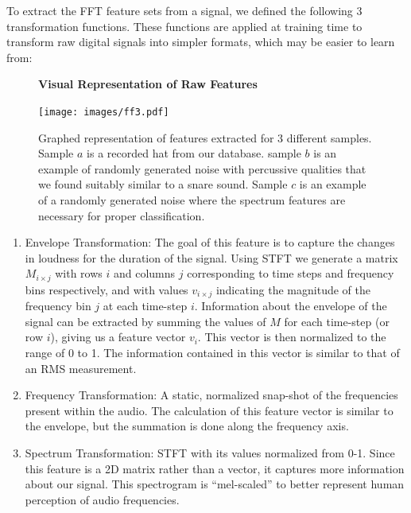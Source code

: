 \documentclass[\main/thesis.tex]{subfiles}
\begin{document}
To extract the FFT feature sets from a signal, we defined the following 3 transformation functions. These functions are applied at training time to transform raw digital signals into simpler formats, which may be easier to learn from: 
\begin{figure}
\centering
\textbf{Visual Representation of Raw Features}\par\medskip
    { \texttt{[image: images/ff3.pdf]}}
\caption{Graphed representation of features extracted for 3 different samples. Sample $a$ is a recorded hat from our database. sample $b$ is an example of randomly generated noise with percussive qualities that we found suitably similar to a snare sound. Sample $c$ is an example of a randomly generated noise where the spectrum features are necessary for proper classification.}
\label{fig:stackspectrums}
\end{figure}
\begin{enumerate}
\item Envelope Transformation: The goal of this feature is to capture the changes in loudness for the duration of the signal. Using STFT we generate a matrix $M_{i \times j}$ with rows $i$ and columns $j$ corresponding to time steps and frequency bins respectively, and with values $v_{i \times j}$ indicating the magnitude of the frequency bin $j$ at each time-step $i$. Information about the envelope of the signal can be extracted by summing the values of $M$ for each time-step (or row $i$), giving us a feature vector $v_i$. This vector is then normalized to the range of 0 to 1. The information contained in this vector is similar to that of an RMS measurement.
\item Frequency Transformation: A static, normalized snap-shot of the  frequencies present within the audio. The calculation of this feature vector is similar to the envelope, but the summation is done along the frequency axis.
\item Spectrum Transformation: STFT with its values normalized from 0-1. Since this feature is a 2D matrix rather than a vector, it captures more information about our signal. This spectrogram is \enquote{mel-scaled}\cite{stevens1940relation} to better represent human perception of audio frequencies.
\end{enumerate}
\end{document}
